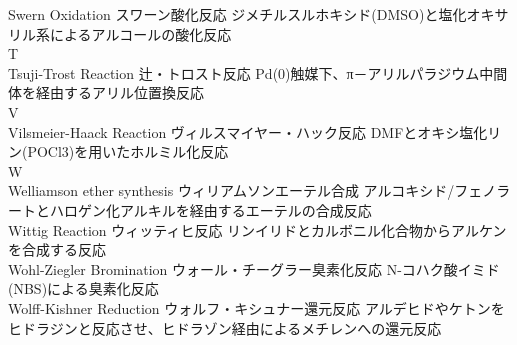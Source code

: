 \documentclass[dvipdfmx,uplatex]{jsarticle}
\begin{document}
Swern Oxidation	スワーン酸化反応
	ジメチルスルホキシド(DMSO)と塩化オキサリル系によるアルコールの酸化反応 \\
T \\
Tsuji-Trost Reaction	辻・トロスト反応
	Pd(0)触媒下、π－アリルパラジウム中間体を経由するアリル位置換反応 \\
V \\
Vilsmeier-Haack Reaction	ヴィルスマイヤー・ハック反応
	DMFとオキシ塩化リン(POCl3)を用いたホルミル化反応 \\
W \\
Welliamson ether synthesis	ウィリアムソンエーテル合成
	アルコキシド/フェノラートとハロゲン化アルキルを経由するエーテルの合成反応 \\
Wittig Reaction	ウィッティヒ反応
	リンイリドとカルボニル化合物からアルケンを合成する反応 \\
Wohl-Ziegler Bromination	ウォール・チーグラー臭素化反応
	N-コハク酸イミド(NBS)による臭素化反応 \\
Wolff-Kishner Reduction	ウォルフ・キシュナー還元反応
	アルデヒドやケトンをヒドラジンと反応させ、ヒドラゾン経由によるメチレンへの還元反応\\
\end{document}
